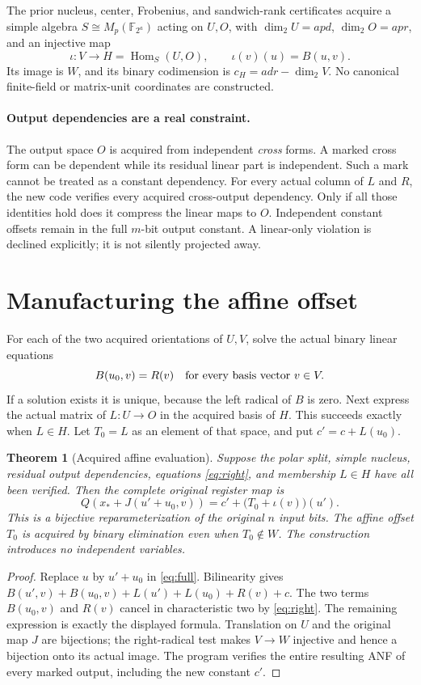 \documentclass[11pt]{article}
\newtheorem{theorem}{Theorem}
\newcommand{\F}{\mathbb F}\newcommand{\Hom}{\operatorname{Hom}}
\begin{document}
The prior nucleus, center, Frobenius, and sandwich-rank certificates
acquire a simple algebra $S\cong M_p(\F_{2^a})$ acting on $U,O$,
with $\dim_2U=apd$, $\dim_2O=apr$, and an injective map
\[
 \iota:V\longrightarrow H=\Hom_S(U,O),\qquad
 \iota(v)(u)=B(u,v).
\]
Its image is $W$, and its binary codimension is
$c_H=adr-\dim_2V$. No canonical finite-field or matrix-unit coordinates
are constructed.

\paragraph{Output dependencies are a real constraint.}
The output space $O$ is acquired from independent \emph{cross} forms.
A marked cross form can be dependent while its residual linear part is
independent. Such a mark cannot be treated as a constant dependency.
For every actual column of $L$ and $R$, the new code verifies every
acquired cross-output dependency. Only if all those identities hold
does it compress the linear maps to $O$. Independent constant offsets
remain in the full $m$-bit output constant. A linear-only violation is
declined explicitly; it is not silently projected away.

\section{Manufacturing the affine offset}

For each of the two acquired orientations of $U,V$, solve the actual
binary linear equations
\begin{equation}
 B(u_0,v)=R(v)\quad\hbox{for every basis vector }v\in V.
 \label{eq:right}
\end{equation}
If a solution exists it is unique, because the left radical of $B$ is
zero. Next express the actual matrix of $L:U\to O$ in the acquired basis
of $H$. This succeeds exactly when $L\in H$. Let $T_0=L$ as an element
of that space, and put $c'=c+L(u_0)$.

\begin{theorem}[Acquired affine evaluation]
Suppose the polar split, simple nucleus, residual output dependencies,
equations \eqref{eq:right}, and membership $L\in H$ have all been
verified. Then the complete original register map is
\[
 \boxed{Q(x_*+J(u'+u_0,v))
       =c'+\bigl(T_0+\iota(v)\bigr)(u').}
\]
This is a bijective reparameterization of the original $n$ input bits.
The affine offset $T_0$ is acquired by binary elimination even when
$T_0\notin W$. The construction introduces no independent variables.
\end{theorem}
\begin{proof}
Replace $u$ by $u'+u_0$ in \eqref{eq:full}. Bilinearity gives
$B(u',v)+B(u_0,v)+L(u')+L(u_0)+R(v)+c$.
The two terms $B(u_0,v)$ and $R(v)$ cancel in characteristic two by
\eqref{eq:right}. The remaining expression is exactly the displayed
formula. Translation on $U$ and the original map $J$ are bijections;
the right-radical test makes $V\to W$ injective and hence a bijection
onto its actual image. The program verifies the entire resulting ANF
of every marked output, including the new constant $c'$.
\end{proof}
\end{document}
